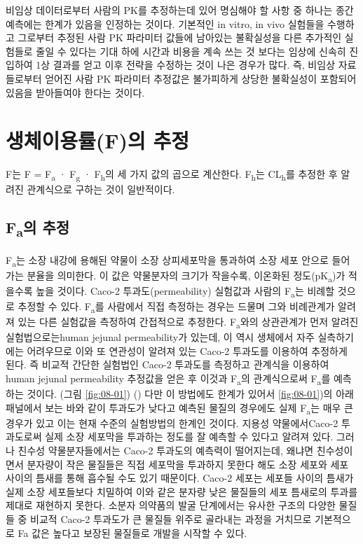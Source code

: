 \documentclass[
  11pt,
  krantz2, a4paper, twoside]{krantz}
\begin{document}
비임상 데이터로부터 사람의 PK를 추정하는데 있어 명심해야 할 사항 중 하나는 종간 예측에는 한계가 있음을 인정하는 것이다.
기본적인 in vitro, in vivo 실험들을 수행하고 그로부터 추정된 사람 PK 파라미터 값들에 남아있는 불확실성을 다른 추가적인 실험들로 줄일 수 있다는 기대 하에 시간과 비용을 계속 쓰는 것 보다는 임상에 신속히 진입하여 1상 결과를 얻고 이후 전략을 수정하는 것이 나은 경우가 많다.
즉, 비임상 자료들로부터 얻어진 사람 PK 파라미터 추정값은 불가피하게 상당한 불확실성이 포함되어 있음을 받아들여야 한다는 것이다.

\section{생체이용률(F)의 추정}\label{uxc0dduxccb4uxc774uxc6a9uxb960fuxc758-uxcd94uxc815}

F는 F = F\textsubscript{a} · F\textsubscript{g} · F\textsubscript{h}의 세 가지 값의 곱으로 계산한다.
F\textsubscript{h}는 CL\textsubscript{h}를 추정한 후 알려진 관계식으로 구하는 것이 일반적이다.

\subsection{\texorpdfstring{F\textsubscript{a}의 추정}{Fa의 추정}}\label{fauxc758-uxcd94uxc815}

F\textsubscript{a}는 소장 내강에 용해된 약물이 소장 상피세포막을 통과하여 소장 세포 안으로 들어가는 분율을 의미한다.
이 값은 약물분자의 크기가 작을수록, 이온화된 정도(pK\textsubscript{a})가 적을수록 높을 것이다.
Caco-2 투과도(permeability) 실험값과 사람의 F\textsubscript{a}는 비례할 것으로 추정할 수 있다.
F\textsubscript{a}를 사람에서 직접 측정하는 경우는 드물며 그와 비례관계가 알려져 있는 다른 실험값을 측정하여 간접적으로 추정한다.
F\textsubscript{a}와의 상관관계가 먼저 알려진 실험법으로는human jejunal permeability가 있는데, 이 역시 생체에서 자주 실측하기에는 어려우므로 이와 또 연관성이 알려져 있는 Caco-2 투과도를 이용하여 추정하게 된다.
즉 비교적 간단한 실험법인 Caco-2 투과도를 측정하고 관계식을 이용하여 human jejunal permeability 추정값을 얻은 후 이것과 F\textsubscript{a}의 관계식으로써 F\textsubscript{a}를 예측하는 것이다. (그림 \ref{fig:08-01}) ()
다만 이 방법에도 한계가 있어서 \ref{fig:08-01})의 아래 패널에서 보는 바와 같이 투과도가 낮다고 예측된 물질의 경우에도 실제 F\textsubscript{a}는 매우 큰 경우가 있고 이는 현재 수준의 실험방법의 한계인 것이다.
지용성 약물에서Caco-2 투과도로써 실제 소장 세포막을 투과하는 정도를 잘 예측할 수 있다고 알려져 있다.
그러나 친수성 약물분자들에서는 Caco-2 투과도의 예측력이 떨어지는데, 왜냐면 친수성이면서 분자량이 작은 물질들은 직접 세포막을 투과하지 못한다 해도 소장 세포와 세포 사이의 틈새를 통해 흡수될 수도 있기 때문이다.
Caco-2 세포는 세포들 사이의 틈새가 실제 소장 세포들보다 치밀하여 이와 같은 분자량 낮은 물질들의 세포 틈새로의 투과를 제대로 재현하지 못한다.
소분자 의약품의 발굴 단계에서는 유사한 구조의 다양한 물질들 중 비교적 Caco-2 투과도가 큰 물질들 위주로 골라내는 과정을 거치므로 기본적으로 Fa 값은 높다고 보장된 물질들로 개발을 시작할 수 있다.
\end{document}
